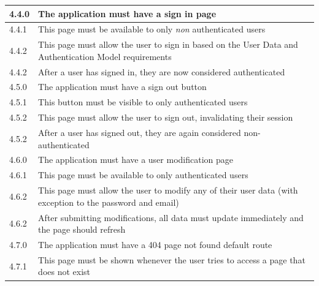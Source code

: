 \documentclass[12pt]{article}
\begin{document}
\begin{longtable}{|l|p{8cm}|}
    \hline\hline
    4.4.0              & The application must have a sign in page                                                                        \\
    \hline
    4.4.1              & This page must be available to only \textit{non} authenticated users                                            \\
    \hline
    4.4.2              & This page must allow the user to sign in based on the User Data and Authentication Model requirements           \\
    \hline
    4.4.2              & After a user has signed in, they are now considered authenticated                                               \\
    \hline

    \hline\hline
    4.5.0              & The application must have a sign out button                                                                     \\
    \hline
    4.5.1              & This button must be visible to only authenticated users                                                         \\
    \hline
    4.5.2              & This page must allow the user to sign out, invalidating their session                                           \\
    \hline
    4.5.2              & After a user has signed out, they are again considered non-authenticated                                        \\
    \hline

    \hline\hline
    4.6.0              & The application must have a user modification page                                                              \\
    \hline
    4.6.1              & This page must be available to only authenticated users                                                         \\
    \hline
    4.6.2              & This page must allow the user to modify any of their user data (with exception to the password and email)       \\
    \hline
    4.6.2              & After submitting modifications, all data must update immediately and the page should refresh                    \\
    \hline

    \hline\hline
    4.7.0              & The application must have a 404 page not found default route                                                    \\
    \hline
    4.7.1              & This page must be shown whenever the user tries to access a page that does not exist                            \\
    \hline
\end{longtable}
\end{document}
